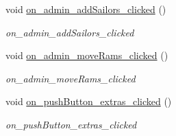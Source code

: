 \begin{DoxyCompactItemize}
\mbox{\label{classadmin_af9bbf623e5ed82f175da4f0e1279d40c}} 
void \hyperlink{classadmin_af9bbf623e5ed82f175da4f0e1279d40c}{on\+\_\+admin\+\_\+add\+Sailors\+\_\+clicked} ()
\begin{DoxyCompactList}\small\item\em on\+\_\+admin\+\_\+add\+Sailors\+\_\+clicked \end{DoxyCompactList}\item 
\mbox{\label{classadmin_a0aaeafe9e5896c9732470d21edf692db}} 
void \hyperlink{classadmin_a0aaeafe9e5896c9732470d21edf692db}{on\+\_\+admin\+\_\+move\+Rams\+\_\+clicked} ()
\begin{DoxyCompactList}\small\item\em on\+\_\+admin\+\_\+move\+Rams\+\_\+clicked \end{DoxyCompactList}\item 
\mbox{\label{classadmin_a3bf6ae296aa18191c8e09c8a8e2cd0d6}} 
void \hyperlink{classadmin_a3bf6ae296aa18191c8e09c8a8e2cd0d6}{on\+\_\+push\+Button\+\_\+extras\+\_\+clicked} ()
\begin{DoxyCompactList}\small\item\em on\+\_\+push\+Button\+\_\+extras\+\_\+clicked \end{DoxyCompactList}\end{DoxyCompactItemize}
